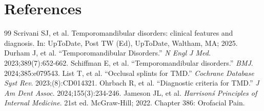 \section*{References}
\begin{thebibliography}{99}
 Scrivani SJ, et al. Temporomandibular disorders: clinical features and diagnosis. In: UpToDate, Post TW (Ed), UpToDate, Waltham, MA; 2025.
 Durham J, et al. ``Temporomandibular Disorders.'' \emph{N Engl J Med}. 2023;389(7):652-662.
 Schiffman E, et al. ``Temporomandibular disorders.'' \emph{BMJ}. 2024;385:e079543.
 List T, et al. ``Occlusal splints for TMD.'' \emph{Cochrane Database Syst Rev}. 2023;(8):CD014321.
 Ohrbach R, et al. ``Diagnostic criteria for TMD.'' \emph{J Am Dent Assoc}. 2024;155(3):234-246.
 Jameson JL, et al. \emph{Harrison\'s Principles of Internal Medicine}. 21st ed. McGraw-Hill; 2022. Chapter 386: Orofacial Pain.
\end{thebibliography}
